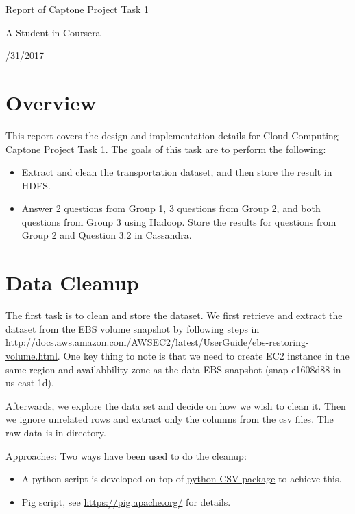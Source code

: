 \documentclass[fontsize=11pt,paper=a4,pagesize=auto]{report}
\begin{document}
\begin{titlepage}
  \vspace*{1cm}
  {\huge\raggedright Report of Captone Project Task 1\par}
  \noindent\hrulefill\par
  {\LARGE\raggedleft A Student in Coursera\par}
  \vfill
  {\Large{}/31/2017\par}
\end{titlepage}



\section{Overview}
This report covers the design and implementation details for Cloud Computing Captone Project Task 1. The goals of this task are to perform the following:
\begin{itemize}
\item Extract and clean the transportation dataset, and then store the result in HDFS.
\item Answer 2 questions from Group 1, 3 questions from Group 2, and both questions from Group 3 using Hadoop. Store the results for questions from Group 2 and Question 3.2 in Cassandra.   
\end{itemize}
 
\section{Data Cleanup}
\par The first task is to clean and store the dataset. We  first retrieve and extract the dataset from the EBS volume snapshot by following steps in \url{http://docs.aws.amazon.com/AWSEC2/latest/UserGuide/ebs-restoring-volume.html}. One key thing to note is that we need to create EC2 instance in the same region and availabbility zone as the data EBS snapshot (snap-e1608d88 in us-east-1d).   
\par Afterwards, we explore the data set and decide on how we wish to clean it. Then we ignore unrelated rows and extract only the columns from the csv files. The raw data is in  directory. 
\par Approaches: Two ways have been used to do the cleanup: 
\begin{itemize} 
\item A python script is developed on top of \href{https://docs.python.org/2/library/csv.html}{python CSV package} to achieve this. 
\item Pig script, see \url{https://pig.apache.org/} for details. 
\end{itemize}
\end{document}
